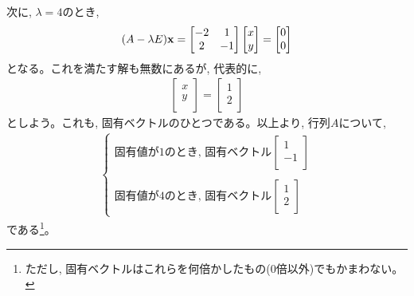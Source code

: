 次に, $\lambda=4$のとき, 
\begin{eqnarray}
(A-\lambda E){\bf x}=
\begin{bmatrix}
-2         & 1 \\
2          & -1 \\
\end{bmatrix}
\begin{bmatrix}
x \\
y \\
\end{bmatrix}
=\begin{bmatrix}
0 \\
0 \\
\end{bmatrix}\end{eqnarray}
となる。これを満たす解も無数にあるが, 代表的に, 
\begin{eqnarray}
\begin{bmatrix}
x \\
y \\
\end{bmatrix}
=\begin{bmatrix}
1 \\
2 \\
\end{bmatrix}
\end{eqnarray}
としよう。これも, 固有ベクトルのひとつである。以上より, 行列$A$について, 
\begin{eqnarray*}\begin{cases}
\text{固有値が}1\text{のとき, 固有ベクトル}
\begin{bmatrix}
1 \\
-1 \\
\end{bmatrix}\\
\\
\text{固有値が}4\text{のとき, 固有ベクトル}
\begin{bmatrix}
1 \\
2 \\
\end{bmatrix}
\end{cases}\end{eqnarray*}
である\footnote{ただし, 固有ベクトルはこれらを何倍かしたもの(0倍以外)でもかまわない。}。
\mv

